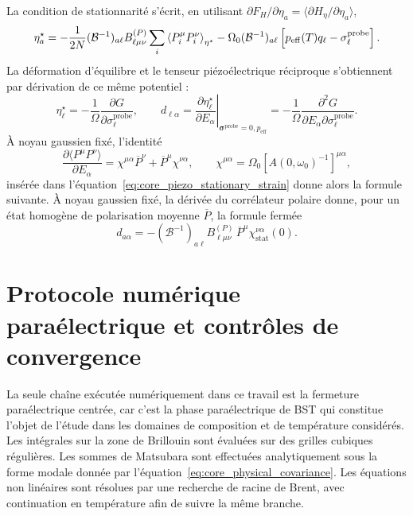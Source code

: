 La condition de stationnarité s'écrit, en utilisant
$\partial F_H/\partial\eta_a=\langle\partial H_\eta/\partial\eta_a\rangle$,
\begin{equation}
\eta_a^\star=-\frac{1}{2N}(\mathcal B^{-1})_{a\ell}
B^{(P)}_{\ell\mu\nu}\sum_i
\left\langle P_i^\mu P_i^\nu\right\rangle_{\eta^\star}
-\Omega_0(\mathcal B^{-1})_{a\ell}
\left[p_{\rm eff}(T)q_\ell-\sigma_\ell^{\rm probe}\right].
\label{eq:core_piezo_stationary_strain}
\end{equation}
La déformation d'équilibre et le tenseur piézoélectrique réciproque s'obtiennent
par dérivation de ce même potentiel :
\begin{equation}
\eta_\ell^\star=-\frac{1}{\Omega}
\frac{\partial G}{\partial\sigma_\ell^{\mathrm{probe}}},
\qquad
d_{\ell\alpha}
=\left.\frac{\partial\eta_\ell^\star}{\partial E_\alpha}
\right|_{\boldsymbol\sigma^{\mathrm{probe}}=0,p_{\mathrm{eff}}}
=-\frac{1}{\Omega}
\frac{\partial^2G}{\partial E_\alpha
\partial\sigma_\ell^{\mathrm{probe}}}.
\label{eq:core_piezo_definition}
\end{equation}
À noyau gaussien fixé, l'identité
\begin{equation}
\frac{\partial\langle P^\mu P^\nu\rangle}
{\partial E_\alpha}
=\chi^{\mu\alpha}\overline P^\nu
+\overline P^\mu\chi^{\nu\alpha},
\qquad
\chi^{\mu\alpha}=\Omega_0[A(0,\omega_0)^{-1}]^{\mu\alpha},
\label{eq:core_piezo_gaussian_correlator_derivative}
\end{equation}
insérée dans l'équation~\eqref{eq:core_piezo_stationary_strain} donne alors la
formule suivante.
À noyau gaussien fixé, la dérivée du corrélateur polaire donne, pour un état
homogène de polarisation moyenne $\overline P$, la formule fermée
\begin{equation}
\boxed{
d_{a\alpha}
=-(\mathcal B^{-1})_{a\ell}
B^{(P)}_{\ell\mu\nu}\,
\overline P^\mu\chi_{\mathrm{stat}}^{\nu\alpha}(0)}.
\label{eq:core_piezo_gaussian}
\end{equation}

\section{Protocole numérique paraélectrique et contrôles de convergence}
\label{ann:protocole_numerique}

La seule chaîne exécutée numériquement dans ce travail est la fermeture
paraélectrique centrée, car c'est la phase paraélectrique de BST qui constitue
l'objet de l'étude dans les domaines de composition et de température
considérés. Les intégrales sur la zone de Brillouin sont évaluées sur des
grilles cubiques régulières. Les sommes de Matsubara sont effectuées
analytiquement sous la forme modale donnée par
l'équation~\eqref{eq:core_physical_covariance}. Les équations non linéaires sont
résolues par une recherche de racine de Brent, avec continuation en température
afin de suivre la même branche.

